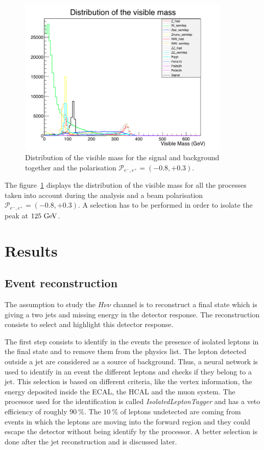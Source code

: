     \begin{figure}[!h]
      \centering
      \includegraphics[width = 0.9\textwidth]{Pictures/Higgs/mVis_all.png}
      \caption{Distribution of the visible mass for the signal and background together and the polarisation $\mathcal{P}_{e^-,e^+} = (-0.8,+0.3)$.}
      \label{fig:mVisAll}
    \end{figure}

    The figure~\ref{fig:mVisAll} displays the distribution of the visible mass for all the processes taken into account during the analysis and a beam polarisation $\mathcal{P}_{e^-,e^+} = (-0.8,+0.3)$.
    A selection has to be performed in order to isolate the peak at $125~\rm{GeV}$.

  \section{Results}
 
    \subsection{Event reconstruction}

    The assumption to study the $H \nu\nu$ channel is to reconstruct a final state which is giving a two jets and missing energy in the detector response.
    The reconstruction consists to select and highlight this detector response.

    The first step consists to identify in the events the presence of isolated leptons in the final state and to remove them from the physics list.
    The lepton detected outside a jet are considered as a source of background.
    Thus, a neural network is used to identify in an event the different leptons and checks if they belong to a jet.
    This selection is based on different criteria, like the vertex information, the energy deposited inside the \gls{ECAL}, the \gls{HCAL} and the muon system. 
    The processor used for the identification is called \textit{IsolatedLeptonTagger} and has a veto efficiency of roughly $90~\%$.
    The $10~\%$ of leptons undetected are coming from events in which the leptons are moving into the forward region and they could escape the detector without being identify by the processor.
    A better selection is done after the jet reconstruction and is discussed later.

